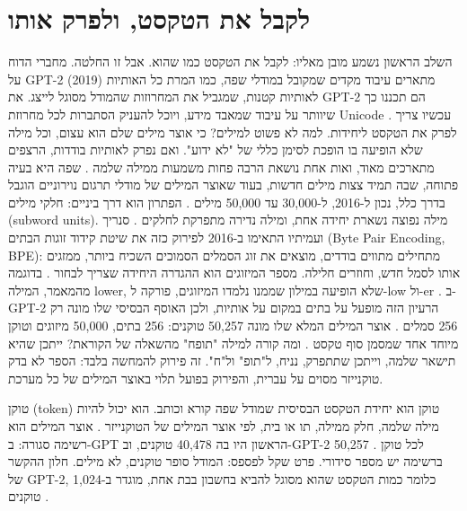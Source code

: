 \section{לקבל את הטקסט, ולפרק אותו}
השלב הראשון נשמע מובן מאליו: לקבל את הטקסט כמו שהוא. אבל זו החלטה. מחברי הדוח על GPT-2 (2019) מתארים עיבוד מקדים שמקובל במודלי שפה, כמו המרת כל האותיות לאותיות קטנות, שמגביל את המחרוזות שהמודל מסוגל לייצג. את GPT-2 הם תכננו כך שיוותר על עיבוד שמאבד מידע, ויוכל להעניק הסתברות לכל מחרוזת Unicode \cite{S-ch04-04}.
עכשיו צריך לפרק את הטקסט ליחידות. למה לא פשוט למילים? כי אוצר מילים שלם הוא עצום, וכל מילה שלא הופיעה בו הופכת לסימן כללי של "לא ידוע". ואם נפרק לאותיות בודדות, הרצפים מתארכים מאוד, ואות אחת נושאת הרבה פחות משמעות ממילה שלמה \cite{S-ch04-06}. שפה היא בעיה פתוחה, שבה תמיד צצות מילים חדשות, בעוד שאוצר המילים של מודלי תרגום נוירוניים הוגבל בדרך כלל, נכון ל-2016, ל-30,000 עד 50,000 מילים \cite{S-ch04-02}.
הפתרון הוא דרך ביניים: חלקי מילים (subword units). מילה נפוצה נשארת יחידה אחת, ומילה נדירה מתפרקת לחלקים \cite{S-ch04-06}. סנריך ועמיתיו התאימו ב-2016 לפירוק כזה את שיטת קידוד זוגות הבתים (Byte Pair Encoding, BPE): מתחילים מתווים בודדים, מוצאים את זוג הסמלים הסמוכים השכיח ביותר, ממזגים אותו לסמל חדש, וחוזרים חלילה. מספר המיזוגים הוא ההגדרה היחידה שצריך לבחור \cite{S-ch04-02}. בדוגמה מהמאמר, המילה lower, שלא הופיעה במילון שממנו נלמדו המיזוגים, פורקה ל-low ול-er \cite{S-ch04-02}.
ב-GPT-2 הרעיון הזה מופעל על בתים במקום על אותיות, ולכן האוסף הבסיסי שלו מונה רק 256 סמלים \cite{S-ch04-04}. אוצר המילים המלא שלו מונה 50,257 טוקנים: 256 בתים, 50,000 מיזוגים וטוקן מיוחד אחד שמסמן סוף טקסט \cite{S-ch04-06}.
ומה קורה למילה "תופח" מהשאלה של הקוראת? ייתכן שהיא תישאר שלמה, וייתכן שתתפרק, נניח, ל"תופ" ול"ח". זה פירוק להמחשה בלבד: הספר לא בדק טוקנייזר מסוים על עברית, והפירוק בפועל תלוי באוצר המילים של כל מערכת.
\begin{conceptbox}{טוקן (token)}
טוקן הוא יחידת הטקסט הבסיסית שמודל שפה קורא וכותב. הוא יכול להיות מילה שלמה, חלק ממילה, תו או בית, לפי אוצר המילים של הטוקנייזר \cite{S-ch04-06}. אוצר המילים הוא רשימה סגורה: ב-GPT הראשון היו בה 40,478 טוקנים, וב-GPT-2 50,257 \cite{S-ch04-06}. לכל טוקן ברשימה יש מספר סידורי.
פרט שקל לפספס: המודל סופר טוקנים, לא מילים. חלון ההקשר של GPT-2, כלומר כמות הטקסט שהוא מסוגל להביא בחשבון בבת אחת, מוגדר ב-1,024 טוקנים \cite{S-ch04-04}.
\end{conceptbox}

